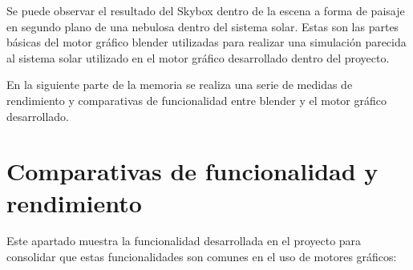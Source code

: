 \documentclass[a4paper, 17pt]{book}
\begin{document}
Se puede observar el resultado del Skybox dentro de la escena a forma de paisaje en segundo plano de una nebulosa dentro
del sistema solar. Estas son las partes básicas del motor gráfico blender utilizadas para realizar una simulación parecida
al sistema solar utilizado en el motor gráfico desarrollado dentro del proyecto. 

\vspace{1mm} %

En la siguiente parte de la memoria se realiza una serie de medidas de rendimiento y comparativas de funcionalidad entre
blender y el motor gráfico desarrollado.

\section{Comparativas de funcionalidad y rendimiento}
\label{sec:CompEngine}

Este apartado muestra la funcionalidad desarrollada en el proyecto para consolidar que estas funcionalidades son comunes en
el uso de motores gráficos:
\end{document}
